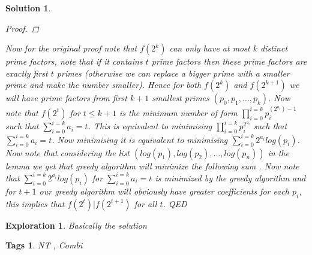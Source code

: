 \documentclass{article}
\newtheorem*{solution}{Solution}
\newtheorem*{exploration}{Exploration}
\newtheorem*{tags}{Tags}
\begin{document}
\begin{solution}
\begin{proof}
		\end{proof}
		Now for the original proof note that $f(2^k)$ can only have at most $k$ distinct prime factors, note that if it contains $t$ prime factors then these prime factors are exactly first $t$ primes (otherwise we can replace a bigger prime with a smaller prime and make the number smaller).
		Hence for both $f(2^k)$  and $f(2^{k+1})$ we will have prime factors from first $k+1$ smallest primes $(p_0,p_1,\dots,p_k)$. Now note that $f(2^t)$ for $t \leq k+1$ is the minimum number of form $\prod_{i=0}^{i=k}p_i^{ (2^{a_i})-1}$ such that $\sum_{i=0}^{i=k} a_i = t$. This is equivalent to minimising $\prod_{i=0}^{i=k}p_i^{ 2^{a_i}}$ such that $\sum_{i=0}^{i=k} a_i = t$. Now minimising it is equivalent to minimising $\sum_{i=0}^{i=k}2^{a_i}log(p_i)$. Now note that considering the list $(log(p_1),log(p_2),\dots,log(p_n))$ in the lemma we get that greedy algorithm will minimize the following sum . Now note that $\sum_{i=0}^{i=k}2^{a_i}log(p_i)$ for $\sum_{i=0}^{i=k} a_i = t$ is minimized by the greedy algorithm and for $t+1$ our greedy algorithm will obviously have greater coefficients for each $p_i$, this implies that $f(2^t)|f(2^{t+1})$ for all $t$. QED
	\end{solution}
	
	\begin{exploration}
		Basically the solution
	\end{exploration}
	
	\begin{tags}
		NT , Combi
	\end{tags}
	
\end{document}
